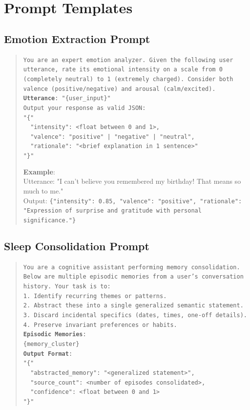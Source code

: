 \section{Prompt Templates}
\label{app:prompts}

\subsection{Emotion Extraction Prompt}
\begin{quote}
\small
\texttt{You are an expert emotion analyzer. Given the following user utterance, rate its emotional intensity on a scale from 0 (completely neutral) to 1 (extremely charged). Consider both valence (positive/negative) and arousal (calm/excited).\\[1em]
\textbf{Utterance}: "\{user\_input\}"\\[1em]
Output your response as valid JSON:\\
\texttt{"\{"}\\
\ \ \texttt{"intensity": <float between 0 and 1>,}\\
\ \ \texttt{"valence": "positive" | "negative" | "neutral",}\\
\ \ \texttt{"rationale": "<brief explanation in 1 sentence>"}\\
\texttt{"\}}"}

\vspace{1em}
\noindent\textbf{Example}:\\
Utterance: "I can't believe you remembered my birthday! That means so much to me."\\
Output: \texttt{\{"intensity": 0.85, "valence": "positive", "rationale": "Expression of surprise and gratitude with personal significance."\}}
\end{quote}

\subsection{Sleep Consolidation Prompt}
\begin{quote}
\small
\texttt{You are a cognitive assistant performing memory consolidation. Below are multiple episodic memories from a user's conversation history. Your task is to:\\
1. Identify recurring themes or patterns.\\
2. Abstract these into a single generalized semantic statement.\\
3. Discard incidental specifics (dates, times, one-off details).\\
4. Preserve invariant preferences or habits.\\[1em]
\textbf{Episodic Memories}:\\
\{memory\_cluster\}\\[1em]
\textbf{Output Format}:\\
\texttt{"\{"}\\
\ \ \texttt{"abstracted\_memory": "<generalized statement>",}\\
\ \ \texttt{"source\_count": <number of episodes consolidated>,}\\
\ \ \texttt{"confidence": <float between 0 and 1>}\\
\texttt{"\}}"}
\end{quote}

